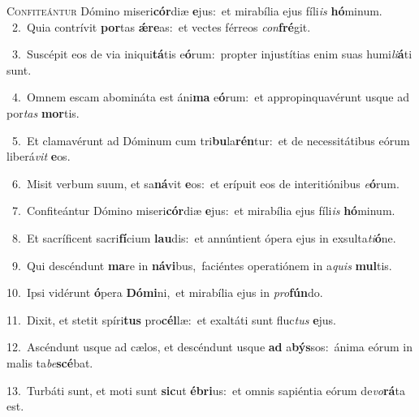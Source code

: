 \lettrine{\initial\textcolor{\initialcolor}{C}}{onfiteántur} Dómino miseri\-\textbf{cór}\-diæ \textbf{e}\-jus:~\star et mirabília ejus fíli\textit{is} \textbf{hó}\-minum.\\
{\numbfont\textcolor{\numbcolor}{~2.}}~Quia contrívit \textbf{por}\-tas \textbf{ǽ}\-\textbf{re}as:~\star et vectes férreos \textit{con}\-\textbf{fré}git.\par
{\numbfont\textcolor{\numbcolor}{~3.}}~Suscépit eos de via iniqui\-\textbf{tá}\-tis e\-\textbf{ó}\-rum:~\star propter injustítias enim suas humi\-\textit{li}\-\textbf{á}ti sunt.\par
{\numbfont\textcolor{\numbcolor}{~4.}}~Omnem escam abomináta est áni\textbf{ma} e\-\textbf{ó}\-rum:~\star et appropinquavérunt usque ad por\textit{tas} \textbf{mor}\-tis.\par
{\numbfont\textcolor{\numbcolor}{~5.}}~Et clamavérunt ad Dóminum cum tri\-\textbf{bu}\-la\-\textbf{rén}\-tur:~\star et de necessitátibus eórum liberá\textit{vit} \textbf{e}\-os.\par
{\numbfont\textcolor{\numbcolor}{~6.}}~Misit verbum suum, et sa\-\textbf{ná}\-vit \textbf{e}\-os:~\star et erípuit eos de interitiónibus \textit{e}\-\textbf{ó}rum.\par
{\numbfont\textcolor{\numbcolor}{~7.}}~Confiteántur Dómino miseri\-\textbf{cór}\-diæ \textbf{e}\-jus:~\star et mirabília ejus fíli\textit{is} \textbf{hó}\-minum.\par
{\numbfont\textcolor{\numbcolor}{~8.}}~Et sacríficent sacri\-\textbf{fí}\-cium \textbf{lau}\-dis:~\star et annúntient ópera ejus in exsulta\-\textit{ti}\-\textbf{ó}ne.\par
{\numbfont\textcolor{\numbcolor}{~9.}}~Qui descéndunt \textbf{ma}\-re in \textbf{ná}\-\textbf{vi}bus,~\star faciéntes operatiónem in a\textit{quis} \textbf{mul}\-tis.\par
{\numbfont\textcolor{\numbcolor}{10.}}~Ipsi vidérunt \textbf{ó}\-pera \textbf{Dó}\-\textbf{mi}ni,~\star et mirabília ejus in \textit{pro}\-\textbf{fún}do.\par
{\numbfont\textcolor{\numbcolor}{11.}}~Dixit, et stetit spíri\textbf{tus} pro\-\textbf{cél}\-læ:~\star et exaltáti sunt fluc\textit{tus} \textbf{e}\-jus.\par
{\numbfont\textcolor{\numbcolor}{12.}}~Ascéndunt usque ad cælos, et descéndunt usque \textbf{ad} a\-\textbf{býs}\-sos:~\star ánima eórum in malis ta\-\textit{be}\-\textbf{scé}bat.\par
{\numbfont\textcolor{\numbcolor}{13.}}~Turbáti sunt, et moti sunt \textbf{sic}\-ut \textbf{é}\-\textbf{bri}us:~\star et omnis sapiéntia eórum de\-\textit{vo}\-\textbf{rá}ta est.\par
